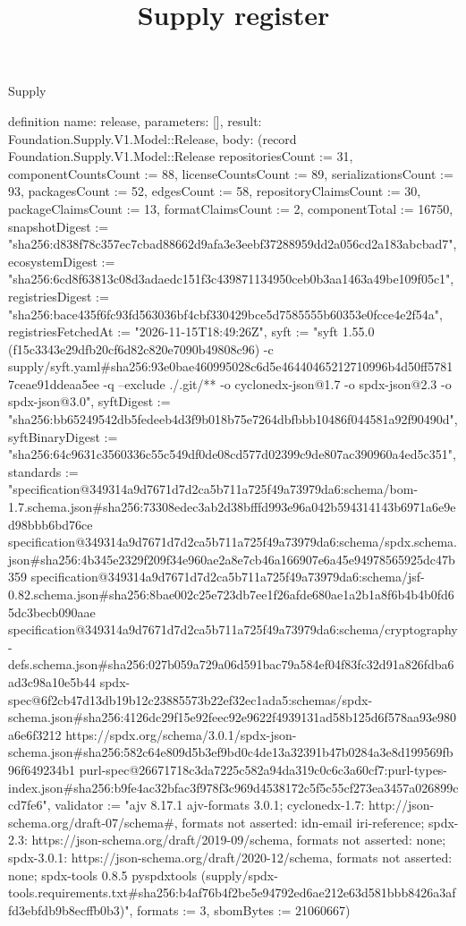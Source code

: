 \begin{lexlean}{Supply}
\title{Supply register}
\begin{semanticmodule}
definition{
  name: release,
  parameters: [],
  result: Foundation.Supply.V1.Model::Release,
  body: (record Foundation.Supply.V1.Model::Release {repositoriesCount := 31, componentCountsCount := 88, licenseCountsCount := 89, serializationsCount := 93, packagesCount := 52, edgesCount := 58, repositoryClaimsCount := 30, packageClaimsCount := 13, formatClaimsCount := 2, componentTotal := 16750, snapshotDigest := "sha256:d838f78c357ec7cbad88662d9afa3e3eebf37288959dd2a056cd2a183abcbad7", ecosystemDigest := "sha256:6cd8f63813c08d3adaedc151f3c439871134950ceb0b3aa1463a49be109f05c1", registriesDigest := "sha256:bace435f6fc93fd563036bf4cbf330429bce5d7585555b60353e0fcce4e2f54a", registriesFetchedAt := "2026-11-15T18:49:26Z", syft := "syft 1.55.0 (f15c3343e29dfb20cf6d82c820e7090b49808c96) -c supply/syft.yaml#sha256:93e0bae460995028c6d5e46440465212710996b4d50ff57817ceae91ddeaa5ee -q --exclude ./.git/** -o cyclonedx-json@1.7 -o spdx-json@2.3 -o spdx-json@3.0", syftDigest := "sha256:bb65249542db5fedeeb4d3f9b018b75e7264dbfbbb10486f044581a92f90490d", syftBinaryDigest := "sha256:64c9631c3560336c55c549df0de08cd577d02399c9de807ac390960a4ed5c351", standards := "specification@349314a9d7671d7d2ca5b711a725f49a73979da6:schema/bom-1.7.schema.json#sha256:73308edec3ab2d38bfffd993e96a042b594314143b6971a6e9ed98bbb6bd76ce specification@349314a9d7671d7d2ca5b711a725f49a73979da6:schema/spdx.schema.json#sha256:4b345e2329f209f34e960ae2a8e7cb46a166907e6a45e94978565925dc47b359 specification@349314a9d7671d7d2ca5b711a725f49a73979da6:schema/jsf-0.82.schema.json#sha256:8bae002c25e723db7ee1f26afde680ae1a2b1a8f6b4b4b0fd65dc3becb090aae specification@349314a9d7671d7d2ca5b711a725f49a73979da6:schema/cryptography-defs.schema.json#sha256:027b059a729a06d591bac79a584ef04f83fc32d91a826fdba6ad3c98a10e5b44 spdx-spec@6f2cb47d13db19b12c23885573b22ef32ec1ada5:schemas/spdx-schema.json#sha256:4126dc29f15e92feec92e9622f4939131ad58b125d6f578aa93e980a6e6f3212 https://spdx.org/schema/3.0.1/spdx-json-schema.json#sha256:582c64e809d5b3ef9bd0c4de13a32391b47b0284a3e8d199569fb96f649234b1 purl-spec@26671718c3da7225c582a94da319c0c6c3a60cf7:purl-types-index.json#sha256:b9fe4ac32bfac3f978f3c969d4538172c5f5c55cf273ea3457a026899ccd7fe6", validator := "ajv 8.17.1 ajv-formats 3.0.1; cyclonedx-1.7: http://json-schema.org/draft-07/schema#, formats not asserted: idn-email iri-reference; spdx-2.3: https://json-schema.org/draft/2019-09/schema, formats not asserted: none; spdx-3.0.1: https://json-schema.org/draft/2020-12/schema, formats not asserted: none; spdx-tools 0.8.5 pyspdxtools (supply/spdx-tools.requirements.txt#sha256:b4af76b4f2be5e94792ed6ae212e63d581bbb8426a3affd3ebfdb9b8ecffb0b3)", formats := 3, sbomBytes := 21060667})
}


\end{semanticmodule}
\end{lexlean}
